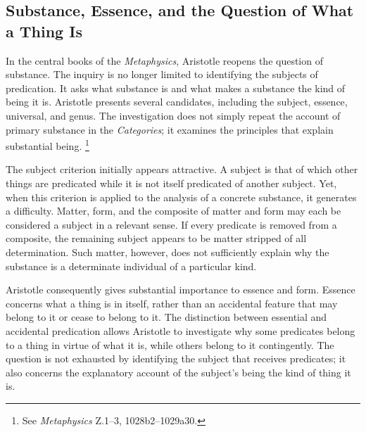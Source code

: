 \subsection{Substance, Essence, and the Question of What a Thing Is}

\label{para:VS.B01.P01.C08.S05.SS04.P001}

In the central books of the \textit{Metaphysics}, Aristotle
reopens the question of substance. The inquiry is no
longer limited to identifying the subjects of predication.
It asks what substance is and what makes a substance
the kind of being it is. Aristotle presents several
candidates, including the subject, essence, universal,
and genus. The investigation does not simply repeat
the account of primary substance in the \textit{Categories};
it examines the principles that explain substantial
being. \footnote{See \textit{Metaphysics} Z.1--3,
1028b2--1029a30.}

\label{para:VS.B01.P01.C08.S05.SS04.P002}

The subject criterion initially appears attractive.
A subject is that of which other things are predicated
while it is not itself predicated of another subject.
Yet, when this criterion is applied to the analysis
of a concrete substance, it generates a difficulty.
Matter, form, and the composite of matter and form
may each be considered a subject in a relevant sense.
If every predicate is removed from a composite, the
remaining subject appears to be matter stripped of
all determination. Such matter, however, does not
sufficiently explain why the substance is a determinate
individual of a particular kind.

\label{para:VS.B01.P01.C08.S05.SS04.P003}

Aristotle consequently gives substantial importance
to essence and form. Essence concerns what a thing
is in itself, rather than an accidental feature that
may belong to it or cease to belong to it. The distinction
between essential and accidental predication allows
Aristotle to investigate why some predicates belong
to a thing in virtue of what it is, while others belong
to it contingently. The question is not exhausted
by identifying the subject that receives predicates;
it also concerns the explanatory account of the
subject's being the kind of thing it is. \cite{AristotleMetaphysics}

\label{para:VS.B01.P01.C08.S05.SS04.P004}

